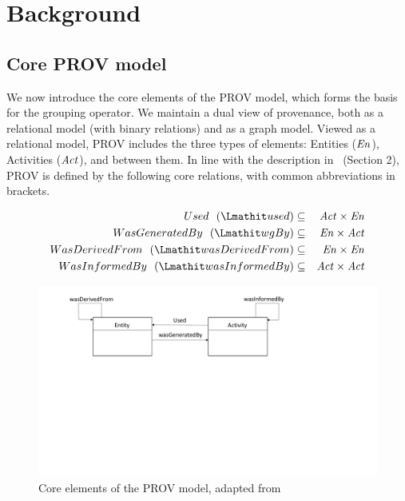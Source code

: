 
\section{Background}
\label{sec:prov-background}

\subsection{Core PROV model} \label{sec:prov-core}

We now introduce the core elements of the PROV model, which forms the basis for the grouping operator.
%
We maintain a dual view of provenance, both as a relational model (with binary relations) and as a graph model. Viewed as a relational model, PROV includes the three types of elements: Entities ($\mathit{En}$), Activities ($\mathit{Act}$),  and  between them. 
In line with the description in~\citep{w3c-prov-dm} (Section 2), PROV is defined by the following core relations, with common abbreviations in brackets. 

\begin{eqnarray*}
Used~~(\used)  & \subseteq & \act \times \en \\
WasGeneratedBy~~(\wgby) & \subseteq  & \en \times \act \\
WasDerivedFrom~~(\wdf) & \subseteq   & \en \times \en \\
WasInformedBy~~(\wasInfBy) & \subseteq & \act \times \act
\end{eqnarray*}


\begin{figure}
\centering
\includegraphics[scale=.45]{figures/prov-essentials.pdf} 
\caption{Core elements of the PROV model, adapted from~\citep{w3c-prov-dm}}
\label{fig:prov-core}
\end{figure}

